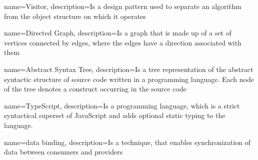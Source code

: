 



{
    name={Visitor},
    description={Is a design pattern used to separate an algorithm from the object structure on which it operates}
}

{
    name={Directed Graph},
    description={Is a graph that is made up of a set of vertices connected by edges, where the edges have a direction associated with them}
}


{
    name={Abstract Syntax Tree},
    description={Is a tree representation of the abstract syntactic structure of source code written in a programming language. Each node of the tree denotes a construct occurring in the source code}
}

{
    name={TypeScript},
    description={Is a programming language, which is a strict syntactical superset of JavaScript and adds optional static typing to the language.}
}

{
    name={data binding},
    description={Is a technique, that enables synchronization of data between consumers and providers}
}












\glsaddall